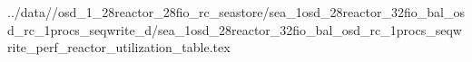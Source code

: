 ../data//osd_1_28reactor_28fio_rc_seastore/sea_1osd_28reactor_32fio_bal_osd_rc_1procs_seqwrite_d/sea_1osd_28reactor_32fio_bal_osd_rc_1procs_seqwrite_perf_reactor_utilization_table.tex